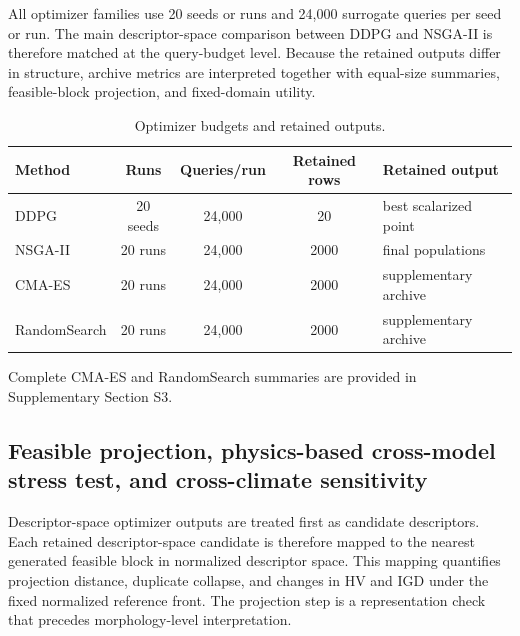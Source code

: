 \documentclass[final,3p,times,numbers,sort&compress]{elsarticle}
\newcommand{\maintablesetup}{%
  \small
  \setlength{\tabcolsep}{4.5pt}%
  \renewcommand{\arraystretch}{1.08}%
}
\newif\ifshowrevision
\newenvironment{revblock}{%
  \ifshowrevision\color{revisionblue}\fi%
}{}
\begin{document}
All optimizer families use 20 seeds or runs and 24,000 surrogate queries per seed or run. The main descriptor-space comparison between DDPG and NSGA-II is therefore matched at the query-budget level. Because the retained outputs differ in structure, archive metrics are interpreted together with equal-size summaries, feasible-block projection, and fixed-domain utility.

\begin{table}[!htbp]
\centering
\caption{Optimizer budgets and retained outputs.}
\label{tab:optimizer-contract}
\maintablesetup
\begin{threeparttable}
\begin{revblock}
\begin{tabular*}{\linewidth}{@{\extracolsep{\fill}}lcccl@{}}
\toprule
Method & Runs & Queries/run & Retained rows & Retained output \\
\midrule
DDPG & 20 seeds & 24,000 & 20 & best scalarized point \\
NSGA-II & 20 runs & 24,000 & 2000 & final populations \\
CMA-ES & 20 runs & 24,000 & 2000 & supplementary archive \\
RandomSearch & 20 runs & 24,000 & 2000 & supplementary archive \\
\bottomrule
\end{tabular*}
\begin{tablenotes}[flushleft]
\footnotesize
\item Complete CMA-ES and RandomSearch summaries are provided in Supplementary Section S3.
\end{tablenotes}
\end{revblock}
\end{threeparttable}
\end{table}

\subsection{Feasible projection, physics-based cross-model stress test, and cross-climate sensitivity}

Descriptor-space optimizer outputs are treated first as candidate descriptors. Each retained descriptor-space candidate is therefore mapped to the nearest generated feasible block in normalized descriptor space. This mapping quantifies projection distance, duplicate collapse, and changes in HV and IGD under the fixed normalized reference front. The projection step is a representation check that precedes morphology-level interpretation.
\end{document}
